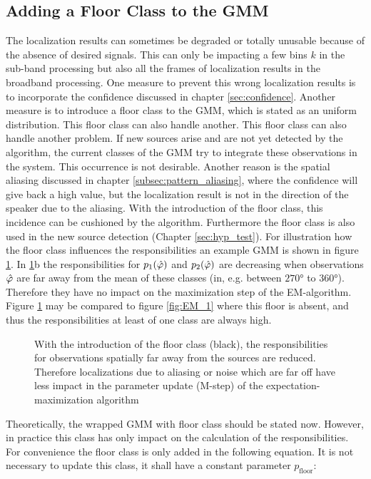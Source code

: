 \subsection{Adding a Floor Class to the GMM}
\label{subsec:floor}
The localization results can sometimes be degraded or totally unusable because of the absence of desired signals. This can only be impacting a few bins $k$ in the sub-band processing but also all the frames of localization results in the broadband processing. One measure to prevent this wrong localization results is to incorporate the confidence discussed in chapter \ref{sec:confidence}. Another measure is to introduce a floor class to the \ac{GMM}, which is stated as an uniform distribution. This floor class can also handle another. This floor class can also handle another problem. If new sources arise and are not yet detected by the algorithm, the current classes of the \ac{GMM} try to integrate these observations in the system. This occurrence is not desirable. Another reason is the spatial aliasing discussed in chapter \ref{subsec:pattern_aliasing}, where the confidence will give back a high value, but the localization result is not in the direction of the speaker due to the aliasing. With the introduction of the floor class, this incidence can be cushioned by the algorithm. Furthermore the floor class is also used in the new source detection (Chapter \ref{sec:hyp_test}). For illustration how the floor class influences the responsibilities an example \ac{GMM} is shown in figure \ref{fig:noise_1}. In \ref{fig:noise_1}b the responsibilities for $p_1(\hat{\varphi})$ and $p_2(\hat{\varphi})$
are decreasing when observations $\hat{\varphi}$ are far away from the mean of these classes (in, e.g. between $\ang{270}$ to $\ang{360}$). Therefore they have no impact on the maximization step of the \ac{EM}-algorithm. Figure \ref{fig:noise_1} may be compared to figure \ref{fig:EM_1} where this floor is absent, and thus the responsibilities at least of one class are always high.
\begin{figure}[!ht]{}
	\centering
	\def\svgwidth{\linewidth}
	\footnotesize
	\caption{With the introduction of the floor class (black), the responsibilities for observations spatially far away from the sources are reduced. Therefore localizations due to aliasing or noise which are far off have less impact in the parameter update (M-step) of the expectation-maximization algorithm}
	\label{fig:noise_1}
\end{figure}
Theoretically, the wrapped \ac{GMM} with floor class should be stated now.
However, in practice this class has only impact on the calculation of the responsibilities. For convenience the floor class is only added in the following equation. It is not necessary to update this class, it shall have a constant parameter $p_{\text{floor}}$:

